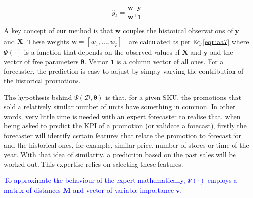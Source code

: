 \documentclass{ieeeaccess}
\newcommand{\myblue}[1]{\textcolor{blue}{#1}}
\begin{document}
\begin{equation}
\hat{y}_k = \frac{\mathbf{w}^\top \mathbf{y}}{\mathbf{w}^\top \mathbf{1}}
\label{eqn:eqminus1}
\end{equation}


A key concept of our method is that $\mathbf{w}$ couples the historical observations of $\mathbf{y}$ and $\mathbf{X}$. These weights $\mathbf{w}=\left[w_1,\dots,w_p\right]^\top$ are calculated as per Eq.\eqref{eqn:aa7} where $\Psi(\cdot)$ is a function that depends on the observed values of $\mathbf{X}$ and $\mathbf{y}$ and the vector of free parameters $\boldsymbol{\theta}$. Vector $\mathbf{1}$ is a column vector of all ones. For a forecaster, the prediction is easy to adjust by simply varying the contribution of the historical promotions.


The hypothesis behind $\Psi(\mathcal{D}, \boldsymbol{\theta})$ is that, for a given SKU, the promotions that sold a relatively similar number of units have something in common. In other words, very little time is needed with an expert forecaster to realise that, when being asked to predict the KPI of a promotion (or validate a forecast), firstly the forecaster will identify certain features that relate the promotion to forecast for and the historical ones, for example, similar price, number of stores or time of the year. With that idea of similarity, a prediction based on the past sales will be worked out. This expertise relies on selecting these features.

\myblue{To approximate the behaviour of the expert mathematically, $\Psi(\cdot)$ employs a matrix of distances $\mathbf{M}$ and vector of variable importance $\mathbf{v}$. %
}
\end{document}
